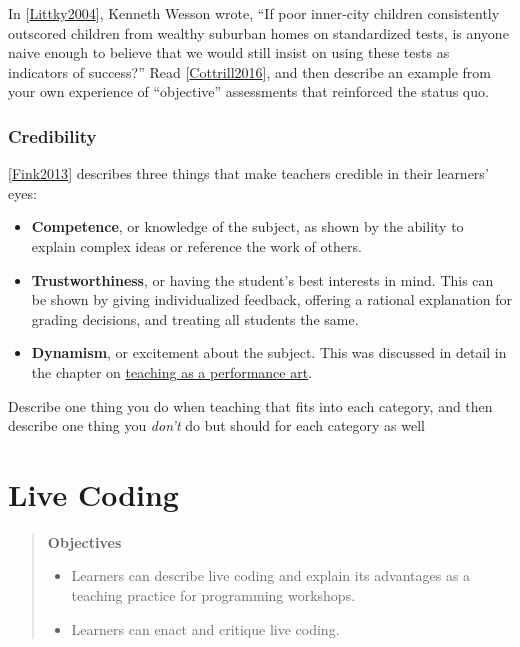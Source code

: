 \documentclass[10pt,statementpaper]{memoir}
\providecommand{\tightlist}{%
  \setlength{\itemsep}{0pt}\setlength{\parskip}{0pt}}
\begin{document}
In {[}\href{biblio.html\#littky-big-picture}{Littky2004}{]}, Kenneth
Wesson wrote, ``If poor inner-city children consistently outscored
children from wealthy suburban homes on standardized tests, is anyone
naive enough to believe that we would still insist on using these tests
as indicators of success?'' Read
{[}\href{biblio.html\#cottrill-gifted}{Cottrill2016}{]}, and then
describe an example from your own experience of ``objective''
assessments that reinforced the status quo.

\subsection{Credibility}\label{credibility}

{[}\href{biblio.html\#fink-significant}{Fink2013}{]} describes three
things that make teachers credible in their learners' eyes:

\begin{itemize}
\item
  \textbf{Competence}, or knowledge of the subject, as shown by the
  ability to explain complex ideas or reference the work of others.
\item
  \textbf{Trustworthiness}, or having the student's best interests in
  mind. This can be shown by giving individualized feedback, offering a
  rational explanation for grading decisions, and treating all students
  the same.
\item
  \textbf{Dynamism}, or excitement about the subject. This was discussed
  in detail in the chapter on \href{performance.html}{teaching as a
  performance art}.
\end{itemize}

Describe one thing you do when teaching that fits into each category,
and then describe one thing you \emph{don't} do but should for each
category as well

\chapter{Live Coding}\label{live-coding}

\begin{quote}
\textbf{Objectives}

\begin{itemize}
\tightlist
\item
  Learners can describe live coding and explain its advantages as a
  teaching practice for programming workshops.
\item
  Learners can enact and critique live coding.
\end{itemize}
\end{quote}
\end{document}
